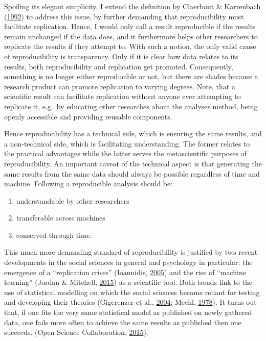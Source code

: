 \documentclass[12pt,a4paper,]{article}
\providecommand{\tightlist}{%
  \setlength{\itemsep}{0pt}\setlength{\parskip}{0pt}}
\begin{document}
Spoiling its elegant simplicity, I extend the definition by Claerbout \& Karrenbach (\protect\hyperlink{ref-claerboutElectronicDocumentsGive1992}{1992}) to address this issue, by further demanding that reproducibility must facilitate replication.
Hence, I would only call a result reproducible if the results remain unchanged if the data does, and it furthermore helps other researchers to replicate the results if they attempt to.
With such a notion, the only valid cause of reproducibility is transparency.
Only if it is clear how data relates to its results, both reproducibility and replication get promoted.
Consequently, something is no longer either reproducible or not, but there are shades because a research product can promote replication to varying degrees.
Note, that a scientific result can facilitate replication without anyone ever attempting to replicate it, e.g.~by educating other researches about the analyses method, being openly accessible and providing reusable components.

Hence reproducibility has a technical side, which is ensuring the same results, and a non-technical side, which is facilitating understanding.
The former relates to the practical advantages while the latter serves the metascientific purposes of reproducibility.
An important caveat of the technical aspect is that generating the same results from the same data should always be possible regardless of time and machine.
Following a reproducible analysis should be:

\begin{enumerate}
\def\labelenumi{\arabic{enumi}.}
\tightlist
\item
  understandable by other researchers
\item
  transferable across machines
\item
  conserved through time.
\end{enumerate}

This much more demanding standard of reproducibility is justified by two recent developments in the social sciences in general and psychology in particular: the emergence of a ``replication crises'' (Ioannidis, \protect\hyperlink{ref-ioannidisWhyMostPublished2005}{2005}) and the rise of ``machine learning'' (Jordan \& Mitchell, \protect\hyperlink{ref-jordanMachineLearningTrends2015}{2015}) as a scientific tool.
Both trends link to the use of statistical modelling on which the social sciences became reliant for testing and developing their theories (Gigerenzer et al., \protect\hyperlink{ref-gigerenzerNullRitualWhat2004}{2004}; Meehl, \protect\hyperlink{ref-meehlTheoreticalRisksTabular1978}{1978}).
It turns out that, if one fits the very same statistical model as published on newly gathered data, one fails more often to achieve the same results as published then one succeeds. (Open Science Collaboration, \protect\hyperlink{ref-opensciencecollaborationEstimatingReproducibilityPsychological2015}{2015}).
\end{document}

